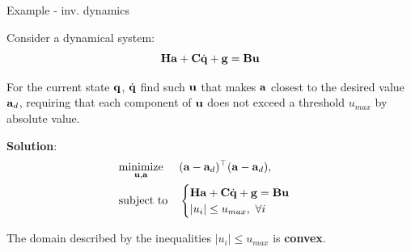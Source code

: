\documentclass{beamer}
\begin{document}
\begin{frame}{Example - inv. dynamics}
	\begin{flushleft}
		
		Consider a dynamical system:
		\begin{equation}
			\mathbf{H} \mathbf{a} + \mathbf{C}\dot{\mathbf{q}} + \mathbf{g} = \mathbf{B}\mathbf{u}
		\end{equation}		
		
		For the current state $\mathbf{q}$, $\dot{\mathbf{q}}$ find such $\mathbf{u}$ that makes $\mathbf{a}$ closest to the desired value $\mathbf{a}_d$, \textcolor{mydarkred}{ requiring that each component of $\mathbf{u}$ does not exceed a threshold $u_{max}$ by absolute value.}
		
		\bigskip
		
		\textbf{Solution}:
		\begin{equation}
			\begin{aligned}
				& \underset{\mathbf{u}, \mathbf{a}}{\text{minimize}}
				& & (\mathbf{a}-\mathbf{a}_d)^\top (\mathbf{a}-\mathbf{a}_d), \\
				& \text{subject to}
				& & \begin{cases}
					\mathbf{H} \mathbf{a} + \mathbf{C}\dot{\mathbf{q}} + \mathbf{g} = \mathbf{B}\mathbf{u} \\
					|u_i| \leq u_{max}, \ \forall i
				\end{cases}
			\end{aligned}
		\end{equation}
		
		The domain described by the inequalities $|u_i| \leq u_{max}$ is \textbf{convex}.
		
	\end{flushleft}
\end{frame}
\end{document}
